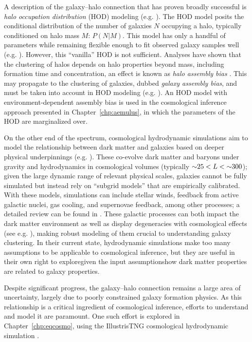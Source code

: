 A description of the galaxy--halo connection that has proven broadly successful is \emph{halo occupation distribution} (HOD) modeling (e.g. \citealt{peacock_halo_2000,Seljak2000,BerlindWeinberg2002}). 
The HOD model posits the conditional distribution of the number of galaxies $N$ occupying a halo, typically conditioned on halo mass $M$: $P(N|M)$.
This model has only a handful of parameters while remaining flexible enough to fit observed galaxy samples well (e.g. \citealt{Zheng2005,reddick_connection_2013}).
However, this ``vanilla'' HOD is not sufficient.
Analyses have shown that the clustering of halos depends on halo properties beyond mass, including formation time and concentration, an effect is known as \emph{halo assembly bias} \citep{wechsler_concentrations_2002, Wechsler2006,mao_beyond_2018}.
This may propagate to the clustering of galaxies, dubbed \emph{galaxy assembly bias}, and must be taken into account in HOD modeling (e.g. \citealt{Tinker2008,hearin_introducing_2016}).
An HOD model with environment-dependent assembly bias is used in the cosmological inference approach presented in Chapter~\ref{chp:aemulus}, in which the parameters of the HOD are marginalized over.

On the other end of the spectrum, cosmological hydrodynamic simulations aim to model the relationship between dark matter and galaxies based on deeper physical underpinnings (e.g. \citealt{springel_gadget_2001, genel_introducing_2014,dave_simba_2019}).
These co-evolve dark matter and baryons under gravity and hydrodynamics in cosmological volumes (typically $\mathord{\sim} 25 < L < \mathord{\sim} 300$); given the large dynamic range of relevant physical scales, galaxies cannot be fully simulated but instead rely on ``subgrid models'' that are empirically calibrated.
With these models, simulations can include stellar winds, feedback from active galactic nuclei, gas cooling, and supernovae feedback, among other processes; a detailed review can be found in \cite{somerville_physical_2015}.
These galactic processes can both impact the dark matter environment as well as display degeneracies with cosmological effects (see e.g. \citealt{villaescusa-navarro_camels_2021}), making robust modeling of them crucial to understanding galaxy clustering.
In their current state, hydrodynamic simulations make too many assumptions to be applicable to cosmological inference, but they are useful in their own right to explore{\emdash}given the input assumptions{\emdash}how dark matter properties are related to galaxy properties.

Despite significant progress, the galaxy--halo connection remains a large area of uncertainty, largely due to poorly constrained galaxy formation physics.
As this relationship is a critical ingredient of cosmological inference, efforts to understand and model it are paramount.
One such effort is explored in Chapter~\ref{chp:eqcosmo}, using the IllustrisTNG cosmological hydrodynamic simulation \citep{springel_first_2018,nelson_first_2018,pillepich_first_2018,naiman_first_2018,marinacci_first_2018}. 


